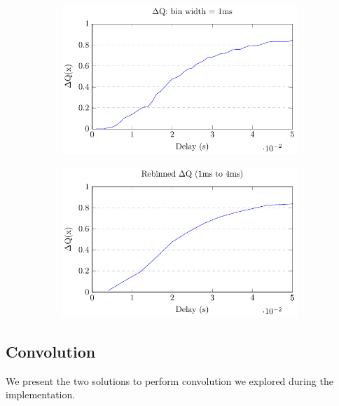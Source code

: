         \begin{figure}[H]
            \centering
            \begin{subfigure}{.5\textwidth}
                \centering
                \includegraphics[width =0.98\textwidth]{tikz/cdf.pdf}
                \label{fig:nrb}
            \end{subfigure}%
            \begin{subfigure}{.5\textwidth}%
                \centering%
                \includegraphics[width =0.98\textwidth]{tikz/rebinned_cdf.pdf}%
                \label{fig:sub2}%
            \end{subfigure}%
            \label{fig:w1w2hb}%
            \end{figure}%

    \subsection{Convolution} \label{convol}
    We present the two solutions to perform convolution we explored during the implementation.  
